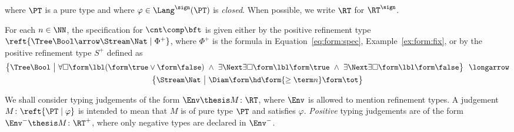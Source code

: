 \noindent
where $\PT$ is a pure type and where
$\varphi \in \Lang^\sign(\PT)$ is \emph{closed}.
When possible, we write $\RT$ for $\RT^\sign$.


\begin{example}
\label{ex:reft:spec}
For each $n \in \NN$,
the specification for $\cnt \comp \bft$
is given either by the positive 
refinement type
$\reft{\Tree\Bool \arrow \Stream\Nat \mid \Phi^+}$,
where $\Phi^+$ is the formula in Equation~\eqref{eq:form:spec},
Example~\ref{ex:form:fix},
or by the positive refinement type
$S^+$ defined as
\begin{multline*}
  \big\{ \Tree\Bool ~\big|~
  \forall\Box\form\lbl(\form\true \lor \form\false)
  ~\land~
  \exists\Next\exists\Box\form\lbl\form\true
  ~\land~
  \exists\Next\exists\Box\form\lbl\form\false \big\}
  ~~\longarrow
\\
  \big\{ \Stream\Nat ~\big|~ \Diam\form\hd \form{\geq \term n} \form\tot \big\}
\end{multline*}
\lipicsEnd
\end{example}


We shall consider typing judgements of the form
$\Env \thesis M \colon \RT$,
where $\Env$ is allowed to mention refinement types.
A judgement
$M \colon \reft{\PT \mid \varphi}$
is intended to mean that $M$ is of pure type $\PT$ and satisfies $\varphi$.
\emph{Positive} typing judgements are of the
form $\Env^- \thesis M \colon \RT^+$,
where only negative types are declared in $\Env^-$.

